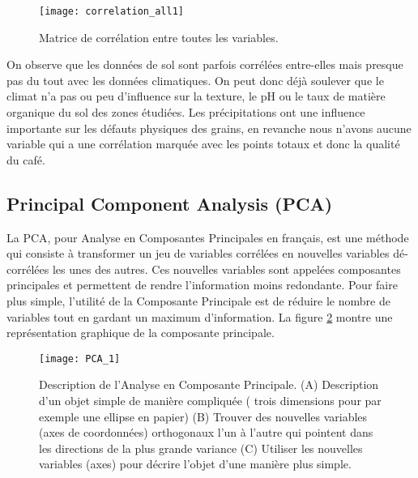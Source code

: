 \begin{figure}[H]
	\texttt{[image: correlation\_all1]}
	\caption{\label{correlation_all1} Matrice de corrélation entre toutes les variables.}
\end{figure}


\noindent On observe que les données de sol sont parfois corrélées entre-elles mais presque pas du tout avec les données climatiques. On peut donc déjà soulever que le climat n'a pas ou peu d'influence sur la texture, le pH ou le taux de matière organique du sol des zones étudiées. Les précipitations ont une influence importante sur les défauts physiques des grains, en revanche nous n'avons aucune variable qui a une corrélation marquée avec les points totaux et donc la qualité du café.   













\newpage
\subsection{Principal Component Analysis (PCA)}\label{PCAss}
La PCA, pour Analyse en Composantes Principales en français, est une méthode qui consiste à transformer un jeu de variables corrélées en nouvelles variables dé-corrélées les unes des autres. Ces nouvelles variables sont appelées composantes principales et permettent de rendre l'information moins redondante. Pour faire plus simple, l'utilité de la Composante Principale est de réduire le nombre de variables tout en gardant un maximum d'information. La figure \ref{PCAdefinition} montre une représentation graphique de la composante principale. 


\begin{figure}[H]
	\texttt{[image: PCA\_1]}
	\caption{\label{PCAdefinition} Description de l'Analyse en Composante Principale. (A) Description d'un objet simple de manière compliquée ( trois dimensions pour par exemple une ellipse en papier) (B) Trouver des nouvelles variables (axes de coordonnées) orthogonaux l'un à l'autre qui pointent dans les directions de la plus grande variance (C) Utiliser les nouvelles variables (axes) pour décrire l'objet d'une manière plus simple. }
\end{figure}

